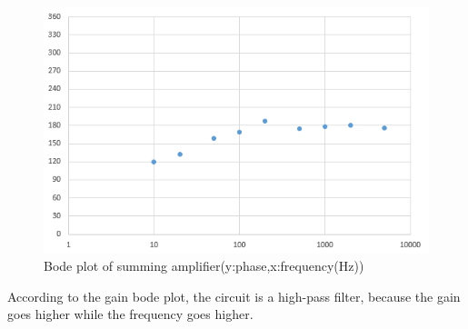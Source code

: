 \begin{figure}[!htbp]
	\centering 
	\begin{framed}
		\includegraphics[width=\linewidth]{images/1_6.PNG} 
		\caption{Bode plot of summing amplifier(y:phase,x:frequency(Hz))}
		\label{fig:107} 
	\end{framed}
\end{figure}

\phantom{ } According to the gain bode plot, the circuit is a high-pass filter, because the gain goes higher while the frequency goes higher.

